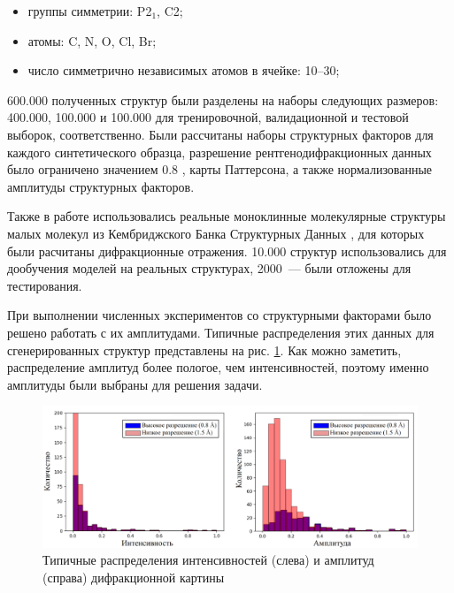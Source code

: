 \begin{itemize}
\item группы симметрии: P2$_1$, C2;
\item атомы: C, N, O, Cl, Br;
\item число симметрично независимых атомов в ячейке: 10--30;
\end{itemize}

600.000 полученных структур были разделены на наборы следующих размеров: 400.000, 100.000 и 100.000 для тренировочной, валидационной и тестовой выборок, соответственно. Были рассчитаны наборы структурных факторов для каждого синтетического образца, разрешение рентгенодифракционных данных было ограничено значением 0.8 \angstrom , карты Паттерсона, а также нормализованные амплитуды структурных факторов.

Также в работе использовались реальные моноклинные молекулярные структуры малых молекул из Кембриджского Банка Структурных Данных \cite{groom_cambridge_2014}, для которых были расчитаны дифракционные отражения. 10.000 структур использовались для дообучения моделей на реальных структурах, 2000~--- были отложены для тестирования.

При выполнении численных экспериментов со структурными факторами было решено работать с их амплитудами. Типичные распределения этих данных для сгенерированных структур представлены на рис. \ref{F_dist}. Как можно заметить, распределение амплитуд более пологое, чем интенсивностей, поэтому именно амплитуды были выбраны для решения задачи. 


\begin{figure}[H]
			\centering
            \includegraphics[width=1\textwidth]{figures/F_both.png}
            \caption{Типичные распределения интенсивностей (слева) и амплитуд (справа) дифракционной картины}
            \label{F_dist}
\end{figure}
 

